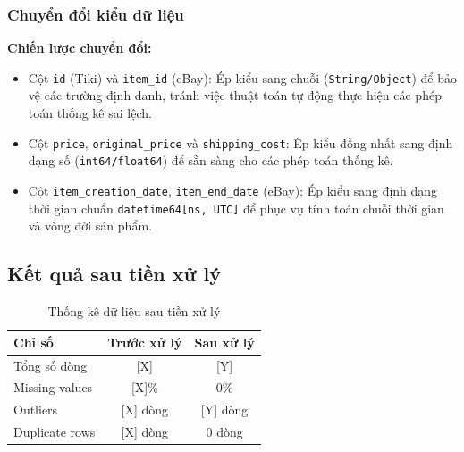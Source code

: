 \subsubsection{Chuyển đổi kiểu dữ liệu}

\textbf{Chiến lược chuyển đổi:}
\begin{itemize}
    \item Cột \texttt{id} (Tiki) và \texttt{item\_id} (eBay): Ép kiểu sang chuỗi (\texttt{String/Object}) để bảo vệ các trường định danh, tránh việc thuật toán tự động thực hiện các phép toán thống kê sai lệch.
    \item Cột \texttt{price}, \texttt{original\_price} và \texttt{shipping\_cost}: Ép kiểu đồng nhất sang định dạng số (\texttt{int64/float64}) để sẵn sàng cho các phép toán thống kê.
    \item Cột \texttt{item\_creation\_date}, \texttt{item\_end\_date} (eBay): Ép kiểu sang định dạng thời gian chuẩn \texttt{datetime64[ns, UTC]} để phục vụ tính toán chuỗi thời gian và vòng đời sản phẩm.
\end{itemize}

\subsection{Kết quả sau tiền xử lý}

\begin{table}[H]
    \centering
    \caption{Thống kê dữ liệu sau tiền xử lý}
    \begin{tabular}{|l|c|c|}
        \hline
        \textbf{Chỉ số} & \textbf{Trước xử lý} & \textbf{Sau xử lý} \\
        \hline
        Tổng số dòng & [X] & [Y] \\
        \hline
        Missing values & [X]\% & 0\% \\
        \hline
        Outliers & [X] dòng & [Y] dòng \\
        \hline
        Duplicate rows & [X] dòng & 0 dòng \\
        \hline
    \end{tabular}
\end{table}

\clearpage
